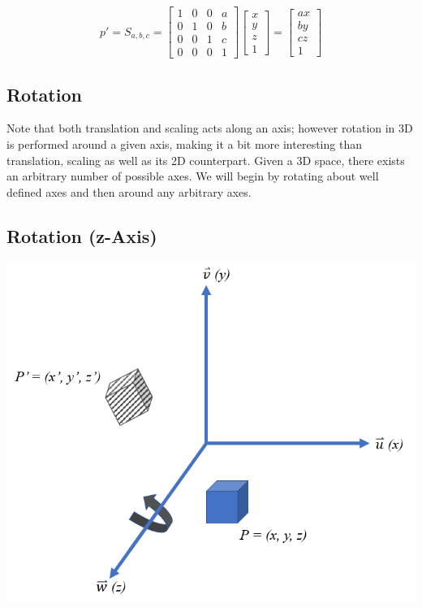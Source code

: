 \documentclass[12pt,letterpaper]{article}
\begin{document}
\begin{equation}
    p' = S_{a, b, c} = \begin{bmatrix}
        1 & 0 & 0 & a \\
        0 & 1 & 0 & b \\
        0 & 0 & 1 & c \\
        0 & 0 & 0 & 1
    \end{bmatrix}
    \begin{bmatrix}
        x \\
        y \\
        z \\
        1
    \end{bmatrix}
    = \begin{bmatrix}
        ax \\
        by \\
        cz \\
        1
    \end{bmatrix}
\end{equation}

\subsection{Rotation}
Note that both translation and scaling acts along an axis; however rotation in 3D is performed around a given axis, making it a bit more interesting than translation, scaling as well as its 2D counterpart. Given a 3D space, there exists an arbitrary number of possible axes.  We will begin by rotating about well defined axes and then around any arbitrary axes.

\subsection{Rotation (z-Axis)}
\begin{center}
\includegraphics[scale=0.75]{zRotation}
\end{center}
\end{document}

